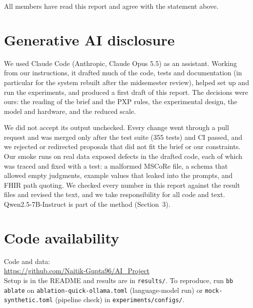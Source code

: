 \documentclass[11pt,a4paper,twocolumn]{article}
\newcommand{\githuburl}{https://github.com/Naitik-Gupta96/AI_Project}
\begin{document}
\smallskip
\noindent All members have read this report and agree with the statement above.

\section*{Generative AI disclosure}
We used Claude Code (Anthropic, Claude Opus 5.5) as an assistant. Working from our
instructions, it drafted much of the code, tests and documentation (in particular for the
system rebuilt after the midsemester review), helped set up and run the experiments, and
produced a first draft of this report. The decisions were ours: the reading of the brief and
the PXP rules, the experimental design, the model and hardware, and the reduced scale.

We did not accept its output unchecked. Every change went through a pull request and was merged
only after the test suite (355 tests) and CI passed, and we rejected or redirected proposals that
did not fit the brief or our constraints. Our smoke runs on real data exposed defects in the
drafted code, each of which was traced and fixed with a test: a malformed MSCoRe file, a schema
that allowed empty judgments, example values that leaked into the prompts, and FHIR path
quoting. We checked every number in this report against the result files and revised the text,
and we take responsibility for all code and text. Qwen2.5-7B-Instruct is part of the method
(Section~3).

\section*{Code availability}
\noindent Code and data:\\
\url{\githuburl}\\
Setup is in the README and results are in \texttt{results/}. To reproduce, run \texttt{bb ablate} on \texttt{ablation-quick-ollama.toml} (language-model run) or \texttt{mock-synthetic.toml} (pipeline check) in \texttt{experiments/configs/}.
\end{document}
